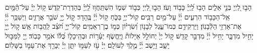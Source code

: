 \documentclass[twoside, openany, parskip=half, 11pt]{book}
\begin{document}
 
הָב֣וּ לַ֭יְיָ בְּנֵ֣י אֵלִ֑ים הָב֥וּ לַֽ֝יְיָ֗ כָּב֥וֹד וָעֹֽז׃ 
הָב֣וּ לַ֭יְיָ כְּב֣וֹד שְׁמ֑וֹ הִשְׁתַּֽחֲו֥וּ לַֽ֝יְיָ֗ בְּהַדְרַת־קֹֽדֶשׁ׃ 
ק֥וֹל יְיָ֗ עַל־הַ֫מָּ֥יִם אֵֽל־הַכָּב֥וֹד הִרְעִ֑ים יְ֜יָ֗ עַל־מַ֥יִם רַבִּֽים׃ 
קֽוֹל־יְיָ֥ בַּכֹּ֑חַ ק֥וֹל יְ֜יָ֗ בֶּֽהָדָר׃ 
ק֣וֹל יְ֖יָ֥ שֹׁבֵ֣ר אֲרָזִ֑ים וַיְשַׁבֵּ֥ר יְ֜יָ֗ אֶת־אַרְזֵ֥י הַלְּֿבָנֽוֹן׃ 
וַיַּרְקִידֵ֥ם כְּמוֹ־עֵ֑גֶל לְבָנ֥וֹן וְ֝שִׂרְי֗וֹן כְּמ֣וֹ בֶן־רְאֵמִֽים׃ 
קֽוֹל־יְיָ֥ חֹ֝צֵ֗ב לַֽהֲב֥וֹת אֵֽשׁ׃ 
ק֣וֹל יְ֖יָ֥ יָחִ֣יל מִדְבָּ֑ר יָחִ֥יל יְ֜יָ֗ מִדְבַּ֣ר קָדֵֽשׁ׃ 
ק֣וֹל יְיָ֙ יְחוֹלֵ֣ל אַיָּלוֹת֘ וַיֶּֽחֱשׂ֢ף יְעָ֫ר֥וֹת וּבְהֵֽיכָל֑וֹ כֻּ֝לּ֗וֹ אֹמֵ֥ר כָּבֽוֹד׃ 
יְ֖יָ לַמַּבּ֣וּל יָשָׁ֑ב וַיֵּ֥שֶׁב יְ֜יָ֗ מֶ֣לֶךְ לְעוֹלָֽם׃ 
יְיָ֗ עֹ֖ז לְעַמּ֣וֹ יִתֵּ֑ן יְיָ֓ יְבָרֵ֖ךְ אֶת־עַמּ֣וֹ בַשָּׁלֽוֹם׃

\halfkaddish


\label{vihi noam} 
\end{document}
